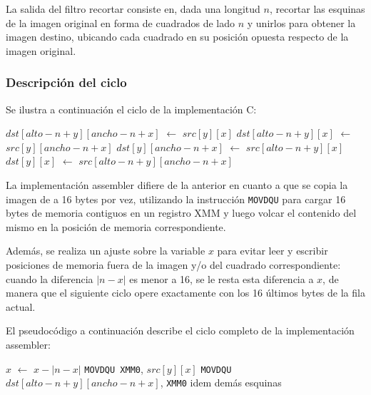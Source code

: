La salida del filtro recortar consiste en, dada una longitud $n$, recortar las esquinas de la imagen
original en forma de cuadrados de lado $n$ y unirlos para obtener la imagen destino, ubicando cada
cuadrado en su posición opuesta respecto de la imagen original.

\subsubsection{Descripción del ciclo}

Se ilustra a continuación el ciclo de la implementación C:

\begin{pseudocodigo}
            \STATE $dst[alto - n + y][ancho - n + x]$ $\leftarrow$ $src[y][x]$ 
            \STATE $dst[alto - n + y][x]$ $\leftarrow$ $src[y][ancho - n + x]$ 
            \STATE $dst[y][ancho - n + x]$ $\leftarrow$ $src[alto - n + y][x]$ 
            \STATE $dst[y][x]$ $\leftarrow$ $src[alto - n + y][ancho - n + x]$ 
        \ENDFOR
    \ENDFOR
\end{pseudocodigo}

La implementación assembler difiere de la anterior en cuanto a que se copia la imagen de a 16 bytes por vez,
utilizando la instrucción \texttt{MOVDQU} para cargar 16 bytes de memoria contiguos en un registro XMM 
y luego volcar el contenido del mismo en la posición de memoria correspondiente.

Además, se realiza un ajuste sobre la variable $x$ para evitar leer y escribir posiciones de memoria fuera
de la imagen y/o del cuadrado correspondiente: cuando la diferencia $|n - x|$ es menor a 16, se le resta
esta diferencia a $x$, de manera que el siguiente ciclo opere exactamente con los 16 últimos bytes de la fila actual.

El pseudocódigo a continuación describe el ciclo completo de la implementación assembler:

\begin{pseudocodigo}
                \STATE $x$ $\leftarrow$ $x - |n - x|$
            \ENDIF
            \STATE \texttt{MOVDQU XMM0}, $src[y][x]$ 
            \STATE \texttt{MOVDQU} $dst[alto - n + y][ancho - n + x]$, \texttt{XMM0}             
            \STATE idem demás esquinas
        \ENDFOR
    \ENDFOR
\end{pseudocodigo}

